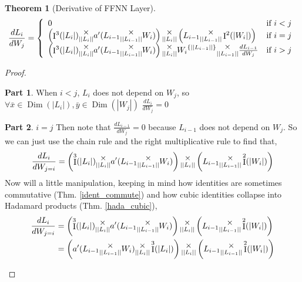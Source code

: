 \documentclass[12pt]{book}
\theoremstyle{plain}
\newtheorem{theorem}{Theorem}[chapter]
\theoremstyle{definition}
\theoremstyle{ppart}
\newtheorem{ppart}{Part}
\theoremstyle{case}
\theoremstyle{solution}
\DeclareMathOperator{\Dim}{Dim}
\DeclareMathOperator{\Ident}{I}
\newcommand{\mmult}[1]{\text{\raisebox{1ex}{$\underset{#1}{\times}$}}}
\newcommand{\shape}[1]{\left|#1\right|}
\newcommand{\transpose}[2]{{#1}^{\{#2\}}}
\begin{document}
\begin{landscape}
\begin{theorem}[Derivative of FFNN Layer]
\[
  \frac{dL_i}{dW_j}
	= \left\{
  \begin{array}{ll}
		0 & \mbox{if } i < j \\
    \left(\Ident^3(\shape{L_i}) \mmult{\shape{\shape{L_i}}} a'(L_{i-1} \mmult{\shape{\shape{L_{i-1}}}} W_i) \right) 
    \mmult{\shape{\shape{L_i}}}
    \left(L_{i-1} \mmult{\shape{\shape{L_{i-1}}}} \Ident^2(\shape{W_i})\right)
	  & \mbox{if } i = j \\
    \left(\Ident^3(\shape{L_i}) \mmult{\shape{\shape{L_i}}} a'(L_{i-1} \mmult{\shape{\shape{L_{i-1}}}} W_i) \right) 
    \mmult{\shape{\shape{L_i}}}
    \transpose{W_i}{\shape{\shape{L_{i-1}}}}
    \mmult{\shape{\shape{L_{i-1}}}}
    \frac{d L_{i-1}}{dW_j}
		& \mbox{if } i > j
  \end{array}
  \right.
\]
\end{theorem}
\begin{proof}
\begin{ppart} When $i < j$,
$L_i$ does not depend on $W_j$, so 
$\forall \bar{x} \in \Dim(\shape{L_i}), \bar{y} \in \Dim(\shape{W_j})$
$\frac{dL_i}{dW_j} = 0$
\end{ppart}
\begin{ppart} $i = j$
Then note that $\frac{dL_{i-1}}{dW_j} = 0$ because $L_{i-1}$ does not
depend on $W_j$. So we can just use the chain rule and the right multiplicative rule to find that,
\[
  \frac{dL_i}{dW_{j=i}} =
    \left(\Ident^3(\shape{L_i}) \mmult{\shape{\shape{L_i}}} a'(L_{i-1} \mmult{\shape{\shape{L_{i-1}}}} W_i) \right) 
    \mmult{\shape{\shape{L_i}}}
    \left(L_{i-1} \mmult{\shape{\shape{L_{i-1}}}} \Ident^2(\shape{W_i})\right)
\]
Now will a little manipulation, keeping in mind how identities are sometimes commutative (Thm. \ref{ident_commute})
and how cubic identities collapse into Hadamard products (Thm. \ref{hada_cubic}),
\begin{align*}
  \frac{dL_i}{dW_{j=i}}
  &=
    \left(\Ident^3(\shape{L_i}) \mmult{\shape{\shape{L_i}}} a'(L_{i-1} \mmult{\shape{\shape{L_{i-1}}}} W_i)\right) 
    \mmult{\shape{\shape{L_i}}}
    \left(L_{i-1} \mmult{\shape{\shape{L_{i-1}}}} \Ident^2(\shape{W_i})\right) \\
  &=
    \left(a'(L_{i-1} \mmult{\shape{\shape{L_{i-1}}}} W_i) \mmult{\shape{\shape{L_i}}} \Ident^3(\shape{L_i})\right) 
    \mmult{\shape{\shape{L_i}}}
    \left(L_{i-1} \mmult{\shape{\shape{L_{i-1}}}} \Ident^2(\shape{W_i})\right) \\

\end{align*}
\end{ppart}
\end{proof}
\end{landscape}
\end{document}
